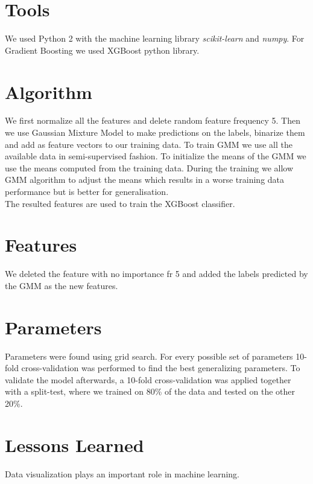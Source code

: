 \documentclass[a4paper, 11pt]{article}
\begin{document}
\section{Tools}
We used Python 2 with the machine learning library \textit{scikit-learn} and \textit{numpy}. For Gradient Boosting we used XGBoost python library.

\section{Algorithm}
We first normalize all the features and delete random feature frequency 5. Then we use Gaussian Mixture Model to make predictions on the labels, binarize them and add as feature vectors to our training data. To train GMM we use all the available data in semi-supervised fashion. To initialize the means of the GMM we use the means computed from the training data. During the training we allow GMM algorithm to adjust the means which results in a worse training data performance but is better for generalisation. \\
The resulted features are used to train the XGBoost classifier. 

\section{Features}
We deleted the feature with no importance fr 5 and added the labels predicted by the GMM as the new features.

\section{Parameters}
Parameters were found using grid search. For every possible set of parameters 10-fold cross-validation was performed to find the best generalizing parameters. To validate the model afterwards, a 10-fold cross-validation was applied together with a split-test, where we trained on 80\% of the data and tested on the other 20\%.

\section{Lessons Learned} Data visualization plays an important role in machine learning.
\end{document}
